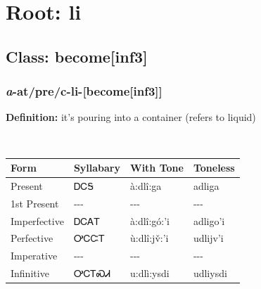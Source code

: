 \needspace{4in}
\section*{Root: li}
\nopagebreak
{}
\needspace{3in}
\subsection*{Class: become[inf3]}
\nopagebreak
\needspace{2in}
\subsubsection*{\textit{a}{-}at/pre/c{-}\textbf{li}{-}[become[inf3]]}
\nopagebreak
\textbf{Definition: } it{\textquoteright}s pouring into a container (refers to liquid)
\\[0.5em]
\begin{tabularx}{\textwidth}{l X X X}%
\toprule%
\textbf{Form}&\textbf{Syllabary}&\textbf{With Tone}&\textbf{Toneless}\\%
\midrule%
Present&ᎠᏟᎦ&à:dlî:ga&adliga\\%
1st Present&{-}{-}{-}&{-}{-}{-}&{-}{-}{-}\\%
Imperfective&ᎠᏟᎪᎢ&à:dlî:gó:’i&adligo’i\\%
Perfective&ᎤᏟᏨᎢ&ù:dlî:jv̌:’i&udlijv’i\\%
Imperative&{-}{-}{-}&{-}{-}{-}&{-}{-}{-}\\%
Infinitive&ᎤᏟᎢᏍᏗ&u:dlì:ysdi&udliysdi\\%
\bottomrule%
\end{tabularx}
\\[1em]